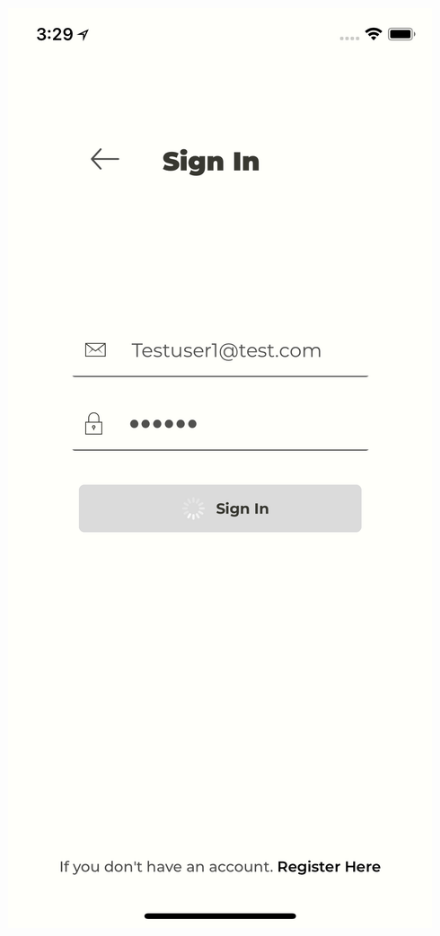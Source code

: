 \begin{figure}[H]
{        \includegraphics[height=.41\textheight, frame]{Figures/interfaces/interface2.png}
    }
\end{figure}
